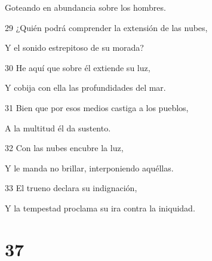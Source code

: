 \par Goteando en abundancia sobre los hombres.
\par 29 ¿Quién podrá comprender la extensión de las nubes,
\par Y el sonido estrepitoso de su morada?
\par 30 He aquí que sobre él extiende su luz,
\par Y cobija con ella las profundidades del mar.
\par 31 Bien que por esos medios castiga a los pueblos,
\par A la multitud él da sustento.
\par 32 Con las nubes encubre la luz,
\par Y le manda no brillar, interponiendo aquéllas.
\par 33 El trueno declara su indignación,
\par Y la tempestad proclama su ira contra la iniquidad.

\chapter{37}

